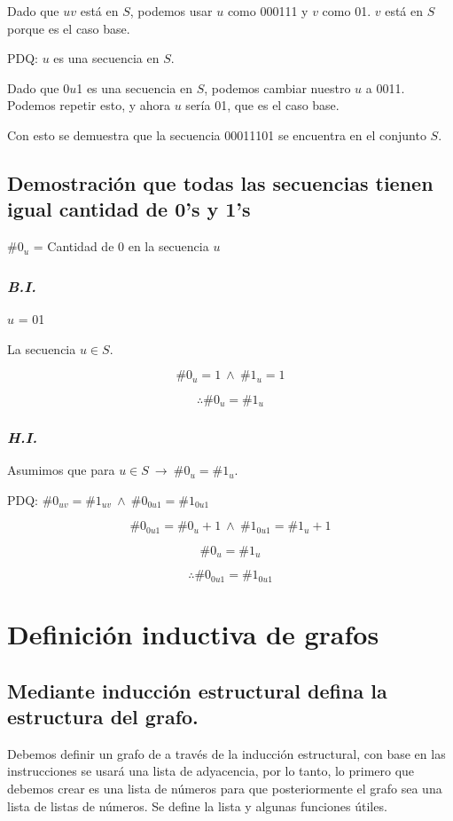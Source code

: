 \documentclass{article}
\begin{document}
Dado que \(uv\) está en \(S\), podemos usar \(u\) como 000111 y \(v\) como 01. \(v\) está en \(S\) porque es el caso base.


PDQ: \(u\) es una secuencia en \(S\).


Dado que 0\(u\)1 es una secuencia en \(S\), podemos cambiar nuestro \(u\) a 0011. Podemos repetir esto, y ahora \(u\) sería 01, que es el caso base.


Con esto se demuestra que la secuencia 00011101 se encuentra en el conjunto \(S\).

\subsection{Demostración que todas las secuencias tienen igual cantidad de 0's y 1's}
\(\#0_u\) = Cantidad de 0 en la secuencia \(u\)

\subsubsection*{\emph{B.I.}}
\(u\) = 01

La secuencia \(u \in S\).

\[\#0_u = 1\ \land\ \#1_u = 1\]

\[\therefore \#0_u = \#1_u\]

\subsubsection*{\emph{H.I.}}
Asumimos que para \(u \in S\ \rightarrow\ \#0_u = \#1_u\).

PDQ: \(\#0_{uv} = \#1_{uv}\ \land\ \#0_{0u1} = \#1_{0u1}\)

\[\#0_{0u1} = \#0_u + 1\ \land\ \#1_{0u1} = \#1_u + 1\]

\[\#0_u = \#1_u\]

\[\therefore \#0_{0u1} = \#1_{0u1}\]

\section{Definición inductiva de grafos}

\subsection{Mediante inducción estructural defina la estructura del grafo.}
Debemos definir un grafo de a través de la inducción estructural, con base en 
las instrucciones se usará una lista de adyacencia, por lo tanto, lo primero que
debemos crear es una lista de números para que posteriormente el grafo sea una 
lista de listas de números. Se define la lista y algunas funciones útiles.
\end{document}
